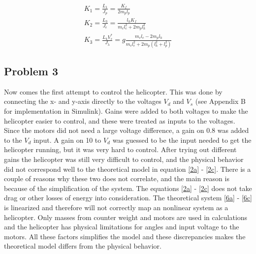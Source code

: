 \begin{subequations}
	\begin{gather}
		K_1 = \frac{L_1}{J_p} = \frac{K_f}{2 m_p l_p}\label{eq:K_1}\\
		K_2 = \frac{L_3}{J_e} = \frac{l_h K_f}{m_c l_{c}^2 + 2m_p l_{h}^2}\label{eq:K_2}\\
        K_3 =\frac{L_4 V_s^*}{J_{\lambda}} = g \frac{m_c l_c - 2 m_p l_h}{m_cl_{c}^2 + 2m_p(l_{h}^2+l_{p}^2)} \label{eq:K_3}
	\end{gather}
\end{subequations}


\subsection{Problem 3}
Now comes the first attempt to control the helicopter. This was done by connecting the x- and y-axis directly to the voltages $V_d$ and $V_s$ (see Appendix B for implementation in Simulink). Gains were added to both voltages to make the helicopter easier to control, and these were treated as inputs to the voltages. Since the motors did not need a large voltage difference, a gain on 0.8 was added to the $V_d$ input. A gain on 10 to $V_d$ was guessed to be the input needed to get the helicopter running, but it was very hard to control. After trying out different gains the helicopter was still very difficult to control, and the physical behavior did not correspond well to the theoretical model in equation \eqref{2a} - \eqref{2c}. 
\newline\newline
There is a couple of reasons why these two does not correlate, and the main reason is because of the simplification of the system. The equations \eqref{2a} - \eqref{2c} does not take drag or other losses of energy into consideration. The theoretical system \eqref{6a} - \eqref{6c} is linearized and therefore will not correctly map an nonlinear system as a helicopter. Only masses from counter weight and motors are used in calculations and the helicopter has physical limitations for angles and input voltage to the motors. All these factors simplifies the model and these discrepancies makes the theoretical model differs from the physical behavior.


